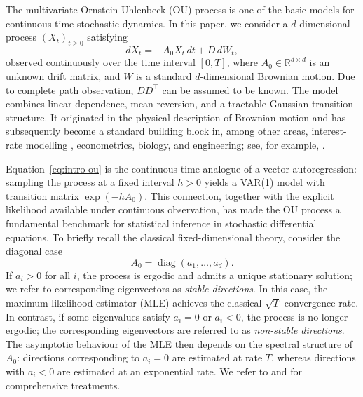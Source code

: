 \documentclass[11pt]{article}
\begin{document}
The multivariate Ornstein-Uhlenbeck (OU) process is one of the basic models for continuous-time stochastic dynamics.  In this paper, we consider a $d$-dimensional process $(X_t)_{t\geq 0}$ satisfying
\begin{equation}\label{eq:intro-ou}
    dX_t=-A_0X_t\,dt+D\,dW_t,
\end{equation}
observed continuously over the time interval $[0,T]$,
where $A_0\in\mathbb{R}^{d\times d}$ is an unknown drift matrix,  and $W$ is a standard $d$-dimensional Brownian motion. Due to complete path observation, $DD^{\top}$ can be assumed to be known. 
The model combines linear dependence, mean reversion, and a tractable Gaussian transition structure.  It originated in the physical description of Brownian motion \citep{UhlenbeckOrnstein1930} and has subsequently become a standard building block in, among other areas, interest-rate modelling \citep{Vasicek1977}, econometrics, biology, and engineering; see, for example, \citet{Gardiner2009}.

Equation~\eqref{eq:intro-ou} is the continuous-time analogue of a vector autoregression: sampling the process at a fixed interval $h>0$ yields a VAR(1) model with transition matrix $\exp(-hA_0)$. This connection, together with the explicit likelihood available under continuous observation, has made the OU process a fundamental benchmark for statistical inference in stochastic differential equations.
To briefly recall the classical fixed-dimensional theory, consider the diagonal case
\[
A_0=\operatorname{diag}(a_1,\ldots,a_d).
\]
If $a_i>0$ for all $i$, the process is ergodic and admits a unique stationary solution; we refer to corresponding eigenvectors as \textit{stable directions}. In this case, the maximum likelihood estimator (MLE) achieves the classical $\sqrt{T}$ convergence rate. In contrast, if some eigenvalues satisfy $a_i=0$ or $a_i<0$, the process is no longer ergodic;
the corresponding eigenvectors are referred to as \textit{non-stable directions}. The asymptotic behaviour of the MLE then depends on the spectral structure of $A_0$: directions corresponding to $a_i=0$ are estimated at rate $T$, whereas directions with $a_i<0$ are estimated at an exponential rate. We refer to \citet{Kutoyants2004} and \citet{BasakLee2008} for comprehensive treatments.
\end{document}
